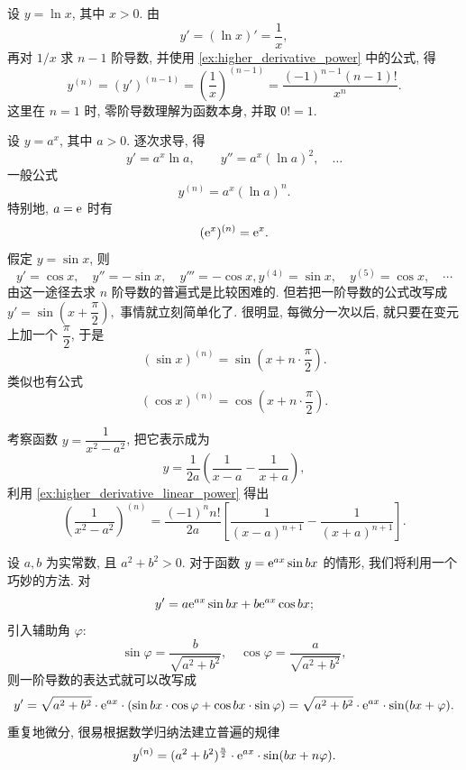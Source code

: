 \label{ex:higher_derivative_logarithm}
设 $y=\ln x$, 其中 $x>0$.
由
$$
y'=(\ln x)'=\frac1x,
$$
再对 $1/x$ 求 $n-1$ 阶导数, 并使用
\ref{ex:higher_derivative_power} 中的公式, 得
$$
y^{(n)}=(y')^{(n-1)}
=\left(\frac1x\right)^{(n-1)}
=\frac{(-1)^{n-1}(n-1)!}{x^n}.
$$
这里在 $n=1$ 时, 零阶导数理解为函数本身, 并取 $0!=1$.

\label{ex:higher_derivative_exponential}
设 $y=a^x$, 其中 $a>0$.
逐次求导, 得
$$
y'=a^x\ln a,\qquad y''=a^x(\ln a)^2,\quad\ldots
$$
一般公式
$$
y^{(n)}=a^x(\ln a)^n.
$$
特别地,  $a=\mathrm{e}$ 时有
$$
(\mathrm{e}^x)^{(n)}=\mathrm{e}^x.
$$
\label{ex:higher_derivative_trigonometric}
假定 $y = \sin x$, 则
$$
    y' = \cos x, \quad y'' = -\sin x, \quad y''' = -\cos x, 
    y^{(4)} = \sin x, \quad y^{(5)} = \cos x, \quad \cdots
$$
由这一途径去求 $n$ 阶导数的普遍式是比较困难的.
但若把一阶导数的公式改写成
$
y' = \sin \left( x + \dfrac{\pi}{2} \right),
$
事情就立刻简单化了.
很明显, 每微分一次以后, 就只要在变元上加一个 $\dfrac{\pi}{2}$, 于是
$$
(\sin x)^{(n)} = \sin \left( x + n \cdot \frac{\pi}{2} \right).
$$
类似也有公式
$$
(\cos x)^{(n)} = \cos \left( x + n \cdot \frac{\pi}{2} \right).
$$

\label{ex:higher_derivative_partial_fractions}
考察函数 $y=\dfrac{1}{x^2 - a^2}$, 
把它表示成为
$$
y = \frac{1}{2a} \left( \frac{1}{x - a} - \frac{1}{x + a} \right),
$$
利用 \ref{ex:higher_derivative_linear_power} 得出
$$
\left( \frac{1}{x^2 - a^2} \right)^{(n)} = \frac{(-1)^n n!}{2a} \left[ \frac{1}{(x - a)^{n+1}} - \frac{1}{(x + a)^{n+1}} \right].
$$

\label{ex:higher_derivative_exponential_sine}
设 $a,b$ 为实常数, 且 $a^2+b^2>0$.
对于函数 $y = \mathrm{e}^{ax} \sin bx$ 的情形, 我们将利用一个巧妙的方法.
对
$$
y' = a\mathrm{e}^{ax} \sin bx + b\mathrm{e}^{ax} \cos bx;
$$
引入辅助角 $\varphi$:
$$
\sin \varphi = \frac{b}{\sqrt{a^2 + b^2}}, \quad \cos \varphi = \frac{a}{\sqrt{a^2 + b^2}},
$$
则一阶导数的表达式就可以改写成
$$
y' = \sqrt{a^2 + b^2} \cdot \mathrm{e}^{ax} \cdot (\sin bx \cdot \cos \varphi + \cos bx \cdot \sin \varphi)
= \sqrt{a^2 + b^2} \cdot \mathrm{e}^{ax} \cdot \sin(bx + \varphi).
$$
重复地微分, 很易根据数学归纳法建立普遍的规律
$$
y^{(n)} = (a^2 + b^2)^{\frac{n}{2}} \cdot \mathrm{e}^{ax} \cdot \sin(bx + n\varphi).
$$

